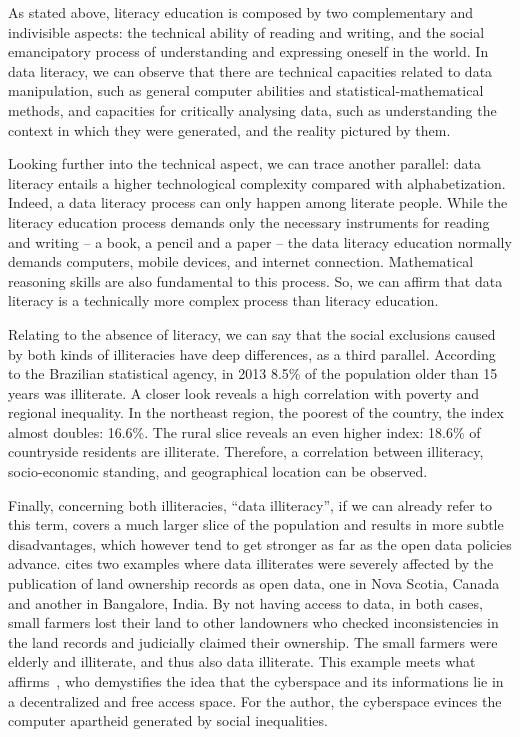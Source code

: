 As stated above, literacy education is composed by two complementary and indivisible aspects: the technical ability of reading and writing, and the social emancipatory process of understanding and expressing oneself in the world. In data literacy, we can observe that there are technical capacities related to data manipulation, such as general computer abilities and statistical-mathematical methods, and capacities for critically analysing data, such as understanding the context in which they were generated, and the reality pictured by them.

Looking further into the technical aspect, we can trace another parallel: data literacy entails a higher technological complexity compared with alphabetization. Indeed, a data literacy process can only happen among literate people. While the literacy education process demands only the necessary instruments for reading and writing – a book, a pencil and a paper – the data literacy education normally demands computers, mobile devices, and internet connection. Mathematical reasoning skills are also fundamental to this process. So, we can affirm that data literacy is a technically more complex process than literacy education.

Relating to the absence of literacy, we can say that the social exclusions caused by both kinds of illiteracies have deep differences, as a third parallel. According to the Brazilian statistical agency, in 2013 8.5\% of the population older than 15 years was illiterate. A closer look reveals a high correlation with poverty and regional inequality. In the northeast region, the poorest of the country, the index almost doubles: 16.6\%. The rural slice reveals an even higher index: 18.6\% of countryside residents are illiterate. Therefore, a correlation between illiteracy, socio-economic standing, and geographical location can be observed. 

Finally, concerning both illiteracies, ``data illiteracy'', if we can already refer to this term, covers a much larger slice of the population and results in more subtle disadvantages, which however tend to get stronger as far as the open data policies advance.  cites two examples where data illiterates were severely affected by the publication of land ownership records as open data, one in Nova Scotia, Canada and another in Bangalore, India. By not having access to data, in both cases, small farmers lost their land to other landowners who checked inconsistencies in the land records and judicially claimed their ownership. The small farmers were elderly and illiterate, and thus also data illiterate. This example meets what affirms~, who demystifies the idea that the cyberspace and its informations lie in a decentralized and free access space. For the author, the cyberspace evinces the computer apartheid generated by social inequalities.

